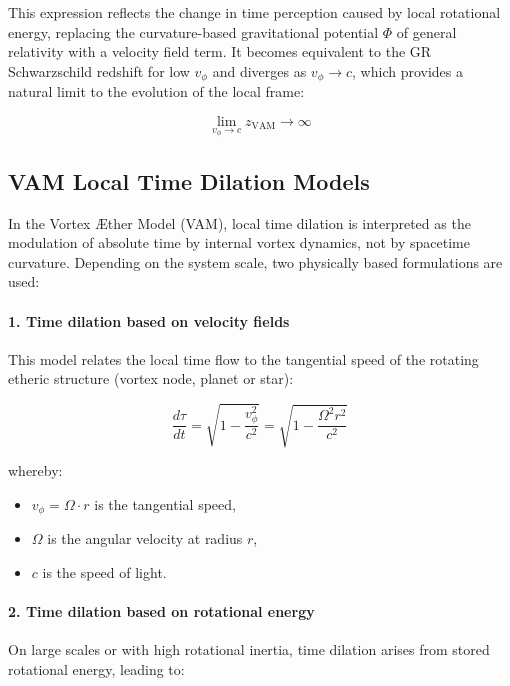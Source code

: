 This expression reflects the change in time perception caused by local rotational energy, replacing the curvature-based gravitational potential \( \Phi \) of general relativity with a velocity field term. It becomes equivalent to the GR Schwarzschild redshift for low \( v_\phi \) and diverges as \( v_\phi \rightarrow c \), which provides a natural limit to the evolution of the local frame:

\begin{equation}
    \lim_{v_\phi \to c} z_{\text{VAM}} \to \infty
\end{equation}

\subsection*{VAM Local Time Dilation Models}

In the Vortex Æther Model (VAM), local time dilation is interpreted as the modulation of absolute time by internal vortex dynamics, not by spacetime curvature. Depending on the system scale, two physically based formulations are used:

\paragraph{1. Time dilation based on velocity fields}

This model relates the local time flow to the tangential speed of the rotating etheric structure (vortex node, planet or star):

\begin{equation}
    \frac{d\tau}{dt} =
    \sqrt{1 - \frac{v_\phi^2}{c^2}} =
    \sqrt{1 - \frac{\Omega^2 r^2}{c^2}}
\end{equation}

whereby:
\begin{itemize}
    \item \( v_\phi = \Omega \cdot r \) is the tangential speed,
    \item \( \Omega \) is the angular velocity at radius \( r \),
    \item \( c \) is the speed of light.
\end{itemize}

\paragraph{2. Time dilation based on rotational energy}

On large scales or with high rotational inertia, time dilation arises from stored rotational energy, leading to:

